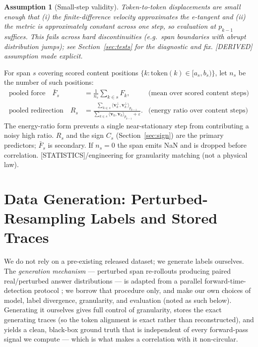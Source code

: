 \documentclass[11pt]{article}
\newtheorem{assumption}{Assumption}
\begin{document}
\begin{assumption}[Small-step validity]
\label{ass:smallstep}
Token-to-token displacements are small enough that (i) the finite-difference velocity approximates the e-tangent and (ii) the metric is approximately constant across one step, so evaluation at $p_{k-1}$ suffices. This fails across hard discontinuities (e.g.\ span boundaries with abrupt distribution jumps); see Section~\ref{sec:tests} for the diagnostic and fix. \textsf{[DERIVED]} assumption made explicit.
\end{assumption}

For span $s$ covering scored content positions $\{k : \text{token}(k)\in[a_s, b_s)\}$, let $n_s$ be the number of such positions:
\begin{align}
  \text{pooled force} \quad \bar F_s &= \frac{1}{n_s}\sum_{k\in s} F_k,
  &\text{(mean over scored content steps)} \\
  \text{pooled redirection} \quad R_s &= \frac{\sum_{k\in s}\langle \bm{v}_k^{\perp},\bm{v}_k^{\perp}\rangle_{p_{k-1}}}{\sum_{k\in s}\langle \bm{v}_k,\bm{v}_k\rangle_{p_{k-1}}+\varepsilon}.
  &\text{(energy ratio over content steps)}
\end{align}
The energy-ratio form prevents a single near-stationary step from contributing a noisy high ratio. $R_s$ and the sign $C_s$ (Section~\ref{sec:sign}) are the primary predictors; $\bar F_s$ is secondary. If $n_s=0$ the span emits NaN and is dropped before correlation. \textsf{[STATISTICS]}/engineering for granularity matching (not a physical law).

\section{Data Generation: Perturbed-Resampling Labels and Stored Traces}
\label{sec:datagen}

We do not rely on a pre-existing released dataset; we generate labels ourselves. The \emph{generation mechanism} --- perturbed span re-rollouts producing paired real/perturbed answer distributions --- is adapted from a parallel forward-time-detection protocol \cite{g1protocol}; we borrow that procedure only, and make our own choices of model, label divergence, granularity, and evaluation (noted as such below). Generating it ourselves gives full control of granularity, stores the exact generating traces (so the token alignment is exact rather than reconstructed), and yields a clean, black-box ground truth that is independent of every forward-pass signal we compute --- which is what makes a correlation with it non-circular.
\end{document}
